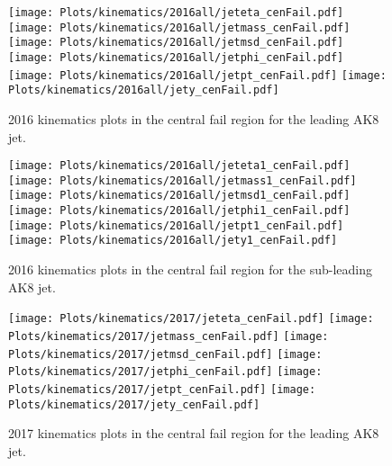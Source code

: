 \begin{figure}[htp]
	\begin{center}
		
		\texttt{[image: Plots/kinematics/2016all/jeteta\_cenFail.pdf]}
		\texttt{[image: Plots/kinematics/2016all/jetmass\_cenFail.pdf]}
		\texttt{[image: Plots/kinematics/2016all/jetmsd\_cenFail.pdf]}
		\texttt{[image: Plots/kinematics/2016all/jetphi\_cenFail.pdf]}
		\texttt{[image: Plots/kinematics/2016all/jetpt\_cenFail.pdf]}
		\texttt{[image: Plots/kinematics/2016all/jety\_cenFail.pdf]}
		
		\caption{2016 kinematics plots in the central fail region for the leading AK8 jet.}
		\label{fig:kin2016_cenFail}
	\end{center}
\end{figure}



\begin{figure}[htp]
	\begin{center}

		\texttt{[image: Plots/kinematics/2016all/jeteta1\_cenFail.pdf]}
		\texttt{[image: Plots/kinematics/2016all/jetmass1\_cenFail.pdf]}
		\texttt{[image: Plots/kinematics/2016all/jetmsd1\_cenFail.pdf]}
		\texttt{[image: Plots/kinematics/2016all/jetphi1\_cenFail.pdf]}
		\texttt{[image: Plots/kinematics/2016all/jetpt1\_cenFail.pdf]}
		\texttt{[image: Plots/kinematics/2016all/jety1\_cenFail.pdf]}

		\caption{2016 kinematics plots in the central fail region for the sub-leading AK8 jet.}
		\label{fig:kin2016_cenFail}
	\end{center}
\end{figure}



\begin{figure}[htp]
	\begin{center}
		
		\texttt{[image: Plots/kinematics/2017/jeteta\_cenFail.pdf]}
		\texttt{[image: Plots/kinematics/2017/jetmass\_cenFail.pdf]}
		\texttt{[image: Plots/kinematics/2017/jetmsd\_cenFail.pdf]}
		\texttt{[image: Plots/kinematics/2017/jetphi\_cenFail.pdf]}
		\texttt{[image: Plots/kinematics/2017/jetpt\_cenFail.pdf]}
		\texttt{[image: Plots/kinematics/2017/jety\_cenFail.pdf]}
		
		\caption{2017 kinematics plots in the central fail region for the leading AK8 jet.}
		\label{fig:kin2017_cenFail}
	\end{center}
\end{figure}



